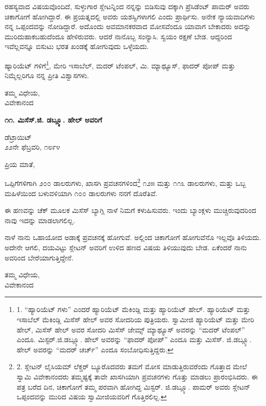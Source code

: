 ರಹಸ್ಯವಾದ ವಿಷಯವೊಂದಿದೆ, ಸುಳ್ಳುಗಾರ ಸ್ಲೇಟನ್ನಿಂದ ನನ್ನನ್ನು ಬಿಡಿಸುವು ದಕ್ಕಾಗಿ ಪ್ರೆಸಿಡೆಂಟ್ ಪಾಮರ್ ಅವರು ಚಿಕಾಗೋಗೆ ಹೋಗಿದ್ದಾರೆ. ಈ ಪ್ರಯತ್ನದಲ್ಲಿ ಅವರು ಯಶಸ್ವಿಗಳಾಗಲಿ ಎಂದು ಪ್ರಾರ್ಥಿಸು. ಅನೇಕ ನ್ಯಾಯವಾದಿಗಳು ನನ್ನ ಒಪ್ಪಂದವನ್ನು ನೋಡಿದ್ದಾರೆ. ಅದೊಂದು ಅವಮಾನಕರವಾದ ಮೋಸವೆಂದೂ ಯಾವಾಗ ಬೇಕಾದರು ಅದನ್ನು ಮುರಿದುಹಾಕಬಹುದೆಂದೂ ಹೇಳಿರುವರು. ಆದರೆ ನಾನೊಬ್ಬ ಸಂನ್ಯಾಸಿ. ಸ್ವಯಂ ರಕ್ಷಣೆ ಬೇಡ. ಆದ್ದರಿಂದ ಇವೆಲ್ಲವನ್ನೂ ಬಿಸುಟು ಭರತ ಖಂಡಕ್ಕೆ ಹೋಗುವುದು ಒಳ್ಳೆಯದು.

ಹ್ಯಾರಿಯೆಟ್ ಗಳಿಗೆ\footnote{1. “ಹ್ಯಾರಿಯೆಟ್ ಗಳು” ಎಂದರೆ ಹ್ಯಾರಿಯೆಟ್ ಮೆಕಿಂಡ್ಲಿ ಮತ್ತು ಹ್ಯಾರಿಯೆಟ್ ಹೇಲ್. ಹ್ಯಾರಿಯೆಟ್ ಮತ್ತು ಇಸಾಬೆಲ್ ಮೆಕಿಂಡ್ಲಿ ಮಿಸೆಸ್ ಹೇಲ್ ಅವರ ಸೋದರಿಯ ಪುತ್ರಿಯರು. ಸ್ವಾಮೀಜಿ ಹ್ಯಾರಿಯೆಟ್ ಮತ್ತು ಮೇರಿ ಹೇಲ್, ಮಿಸೆಸ್ ಹೇಲ್ ಅವರ ಸೋದರಿ ಮಿಸೆಸ್ ಜೇಮ್ಸ್ ಮ್ಯಾಥ್ಯೂಸ್ ಅವರನ್ನು “ಮದರ್ ಟೆಂಪಲ್” ಎಂದೂ. ಮಿಸ್ಟರ್.ಜಿ.ಡಬ್ಲ್ಯೂ. ಹೇಲ್ ಅವರನ್ನು “ಫಾದರ್ ಪೋಪ್” ಎಂದೂ ಮತ್ತು ಮಿಸೆಸ್. ಜಿ.ಡಬ್ಲ್ಯೂ. ಹೇಲ್ ಅವರನ್ನು “ಮದರ್ ಚರ್ಚ್” ಎಂದೂ ಸಂಬೋಧಿಸುತ್ತಿದ್ದರು.}, ಮೇರಿ ಇಸಾಬೆಲ್, ಮದರ್ ಟೆಂಪಲ್, ಮಿ. ಮ್ಯಾಥ್ಯೂಸ್, ಫಾದರ್ ಪೋಪ್ ಮತ್ತು ನಿಮ್ಮೆಲ್ಲರಿಗೂ ನನ್ನ ಪ್ರೀತಿ ವಿಶ್ವಾಸಗಳು.

\begin{flushright}
ತಮ್ಮ ವಿಧೇಯ,\\ವಿವೇಕಾನಂದ
\end{flushright}

\begin{center}
\textbf{೧೧. ಮಿಸೆಸ್.ಜಿ. ಡಬ್ಲ್ಯೂ. ಹೇಲ್ ಅವರಿಗೆ}
\end{center}

\begin{flushright}
ಡೆಟ್ರಾಯಿಟ್\\೨೨ನೇ ಫೆಬ್ರವರಿ, ೧೮೯೪
\end{flushright}

ಪ್ರಿಯ ಮಾತೆ,

ಒಪ್ಪಿಗೆಗಳಿಗಾಗಿ ೨೦೦ ಡಾಲರುಗಳು, ಖಾಸಗಿ ಪ್ರವಚನಗಳಿಂದ\footnote{2. ಸ್ಲೇಟನ್ ಲೈಸಿಯಮ್​ ಲೆಕ್ಚರ್ ಬ್ಯೂರೊದವರು ತಮಗೆ ಮೋಸ ಮಾಡುತ್ತಿರುವರೆಂದು ಗೊತ್ತಾದ ಮೇಲೆ ಸ್ವಾಮಿ ವಿವೇಕಾನಂದರು ತಮ್ಮಷ್ಟಕ್ಕೆ ತಾವೇ ಖಾಸಗಿಯಾಗಿ ಪ್ರವಚನಗಳು ಗೊತ್ತು ಮಾಡಲು ಪ್ರಾರಂಭಿಸಿದರು. ಈ ಪತ್ರ ಬರೆದ ದಿನ, ಚಿಕಾಗೋಗೆ ತಮ್ಮ ಪರವಾಗಿ ಹೋಗಿದ್ದ ಮಿಸ್ಟರ್. ಜಿ.ಡಬ್ಲ್ಯೂ. ಪಾಮರ್ ಅವರು ಸ್ಲೇಟನ್ ಒಪ್ಪಂದವನ್ನು ಮುರಿದ ವಿಷಯ ಸ್ವಾಮೀಜಿಯವರಿಗೆ ಗೊತ್ತಿರಲಿಲ್ಲ.} ೧೨೫ ಮತ್ತು ೧೧೩ ಡಾಲರುಗಳು, ಮತ್ತು ಒಬ್ಬ ಮಹಿಳೆಯಿಂದ ಬಳುವಳಿಯಾಗಿ ೧೦೦ ಡಾಲರುಗಳು ನನಗೆ ದೊರೆತಿವೆ.

ಈ ಹಣವನ್ನು ಚೆಕ್ ಮೂಲಕ ಮಿಸೆಸ್ ಬ್ಯಾಗ್ಲಿ ನಾಳೆ ನಿಮಗೆ ಕಳುಹಿಸುವರು. ಇಂದು ಬ್ಯಾಂಕ್ಗಳು ಮುಚ್ಚಿರುವುದರಿಂದ ನಾವು ಇದನ್ನು ಮಾಡಲಾಗಲಿಲ್ಲ.

ನಾಳೆ ನಾನು ಒಹಾಯೋದ ಅಡಾಕ್ಕೆ ಪ್ರವಚನಕ್ಕೆ ಹೋಗುವೆ. ಅಲ್ಲಿಂದ ಚಿಕಾಗೋಗೆ ಹೋಗುವೆನೊ ಇಲ್ಲವೊ ತಿಳಿಯದು. ಅದೇನೇ ಆಗಲಿ, ದಯವಿಟ್ಟು ಸ್ಲೇಟನ್ ಅವರಿಗೆ ಉಳಿದ ಹಣದ ವಿಷಯ ತಿಳಿಯುವುದು ಬೇಡ. ಏಕೆಂದರೆ ನಾನು ಅವರಿಂದ ಬೇರೆಯಾಗುತ್ತಿದ್ದೇನೆ.

\begin{flushright}
ತಮ್ಮ ವಿಧೇಯ,\\ವಿವೇಕಾನಂದ
\end{flushright}

